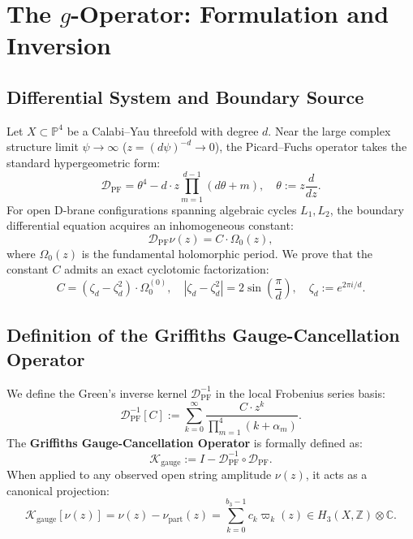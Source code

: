 \documentclass[11pt,a4paper]{article}
\theoremstyle{definition}
\begin{document}
\section{The $g$-Operator: Formulation and Inversion}

\subsection{Differential System and Boundary Source}
Let $X \subset \mathbb{P}^4$ be a Calabi--Yau threefold with degree $d$. Near the large complex structure limit $\psi \to \infty$ ($z = (d\psi)^{-d} \to 0$), the Picard--Fuchs operator takes the standard hypergeometric form:
\begin{equation}
\mathcal{D}_{\text{PF}} = \theta^4 - d \cdot z \prod_{m=1}^{d-1} (d\theta + m), \quad \theta := z \frac{d}{dz}.
\end{equation}
For open D-brane configurations spanning algebraic cycles $L_1, L_2$, the boundary differential equation acquires an inhomogeneous constant:
\begin{equation}
\mathcal{D}_{\text{PF}} \nu(z) = C \cdot \Omega_0(z),
\end{equation}
where $\Omega_0(z)$ is the fundamental holomorphic period. We prove that the constant $C$ admits an exact cyclotomic factorization:
\begin{equation}
C = (\zeta_d - \zeta_d^2) \cdot \Omega_0^{(0)}, \quad |\zeta_d - \zeta_d^2| = 2\sin\left(\frac{\pi}{d}\right), \quad \zeta_d := e^{2\pi i / d}.
\end{equation}

\subsection{Definition of the Griffiths Gauge-Cancellation Operator}
We define the Green's inverse kernel $\mathcal{D}_{\text{PF}}^{-1}$ in the local Frobenius series basis:
\begin{equation}
\mathcal{D}_{\text{PF}}^{-1}[C] := \sum_{k=0}^{\infty} \frac{C \cdot z^k}{\prod_{m=1}^4 (k + \alpha_m)}.
\end{equation}
The \textbf{Griffiths Gauge-Cancellation Operator} is formally defined as:
\begin{equation}
\mathcal{K}_{\text{gauge}} := I - \mathcal{D}_{\text{PF}}^{-1} \circ \mathcal{D}_{\text{PF}}.
\end{equation}
When applied to any observed open string amplitude $\nu(z)$, it acts as a canonical projection:
\begin{equation}
\mathcal{K}_{\text{gauge}}[\nu(z)] = \nu(z) - \nu_{\text{part}}(z) = \sum_{k=0}^{b_3-1} c_k \varpi_k(z) \in H_3(X, \mathbb{Z}) \otimes \mathbb{C}.
\end{equation}
\end{document}
